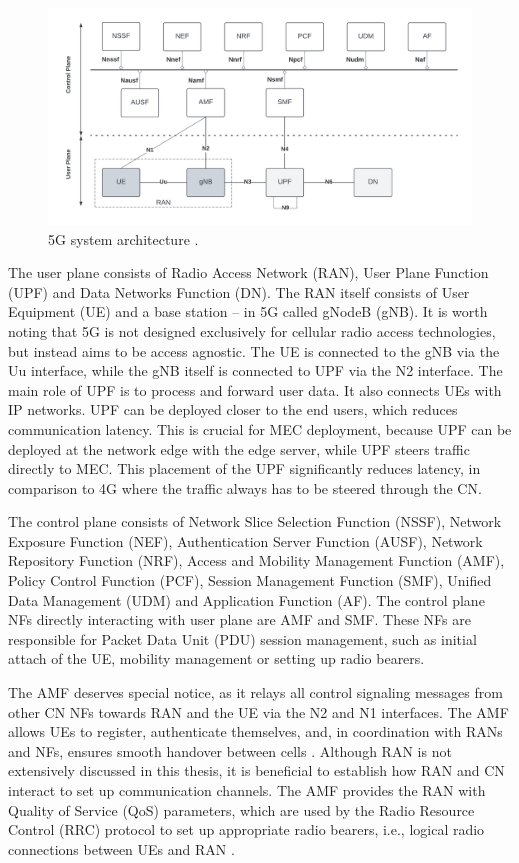 \documentclass[12pt,a4paper,twoside]{report}
\begin{document}
\begin{figure}[ht]
	\centering
	\includegraphics[width=\textwidth]{./images/5G-CN.pdf}
	\caption{5G system architecture \cite{ETSI:TS:5G}.}
	\label{F:5G-arch}
\end{figure}

The user plane consists of Radio Access Network (RAN), User Plane Function (UPF) and Data Networks Function (DN). The RAN itself consists of User Equipment (UE) and a base station – in 5G called gNodeB (gNB). It is worth noting that 5G is not designed exclusively for cellular radio access technologies, but instead aims to be access agnostic. The UE is connected to the gNB via the Uu interface, while the gNB itself is connected to UPF via the N2 interface. The main role of UPF is to process and forward user data. It also connects UEs with IP networks. UPF can be deployed closer to the end users, which reduces communication latency. This is crucial for MEC deployment, because UPF can be deployed at the network edge with the edge server, while UPF steers traffic directly to MEC. This placement of the UPF significantly reduces latency, in comparison to 4G where the traffic always has to be steered through the CN. \cite{rommer20195g}

The control plane consists of Network Slice Selection Function (NSSF), Network Exposure Function (NEF), Authentication Server Function (AUSF), Network Repository Function (NRF), Access and Mobility Management Function (AMF), Policy Control Function (PCF), Session Management Function (SMF), Unified Data Management (UDM) and Application Function (AF). The control plane NFs directly interacting with user plane are AMF and SMF. These NFs are responsible for Packet Data Unit (PDU) session management, such as initial attach of the UE, mobility management or setting up radio bearers. \cite{rommer20195g}
  
The AMF deserves special notice, as it relays all control signaling messages from other CN NFs towards RAN and the UE via the N2 and N1 interfaces. The AMF allows UEs to register, authenticate themselves, and, in coordination with RANs and NFs, ensures smooth handover between cells \cite{rommer20195g}. Although RAN is not extensively discussed in this thesis, it is beneficial to establish how RAN and CN interact to set up communication channels. The AMF provides the RAN with Quality of Service (QoS) parameters, which are used by the Radio Resource Control (RRC) protocol to set up appropriate radio bearers, i.e., logical radio connections between UEs and RAN \cite{dahlman-2020-5g}.
  
\end{document}
